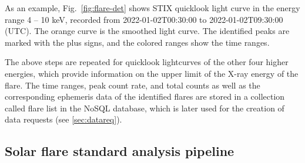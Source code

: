 \documentclass[referee]{preaa} %
\begin{document}
As an example, Fig.~\ref{fig:flare-det} shows STIX quicklook light curve in the energy range 4 -- 10 keV, recorded from  2022-01-02T00:30:00 to 2022-01-02T09:30:00 (UTC).  The orange curve is the smoothed light curve.  The identified peaks are marked with the plus signs, and the colored ranges show the time ranges.

The above steps are repeated for quicklook lightcurves of the other four higher energies, which provide information on the upper limit of the X-ray energy of the flare. The time ranges, peak count rate, and total counts as well as the corresponding ephemeris data of the identified flares are  stored in a collection called flare list in the NoSQL database, which is later used for the creation of data requests (see \ref{sec:datareq}). 


\subsection{Solar flare standard analysis pipeline}
\end{document}

